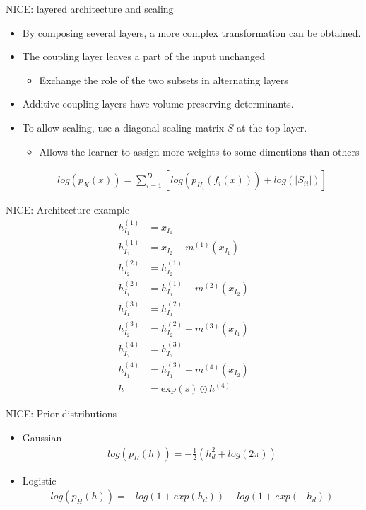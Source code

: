 \begin{frame}{NICE: layered architecture and scaling}
    \begin{itemize}
        \item By composing several layers, a more complex transformation can be obtained.
        \item The coupling layer leaves a part of the input unchanged
        \begin{itemize}
            \item Exchange the role of the two subsets in alternating layers
        \end{itemize}
        \item Additive coupling layers have volume preserving determinants.
        \item To allow scaling, use a diagonal scaling matrix $S$ at the top layer.
        \begin{itemize}
            \item Allows the learner to assign more weights to some dimentions than others
        \end{itemize}
        \begin{align*}
            log(p_X(x)) = \sum_{i=1}^D[log(p_{H_i}(f_i(x)))+log(|S_{ii}|)]
        \end{align*}
    \end{itemize}
\end{frame}
\begin{frame}{NICE: Architecture example}
\begin{align*}
    h_{I_1}^{(1)} &= x_{I_1}\\
    h_{I_2}^{(1)} &= x_{I_2} + m^{(1)}(x_{I_1})\\ 
    h_{I_2}^{(2)} &= h_{I_2}^{(1)}\\
    h_{I_1}^{(2)} &= h_{I_1}^{(1)} + m^{(2)}(x_{I_2})\\ 
    h_{I_1}^{(3)} &= h_{I_1}^{(2)}\\
    h_{I_2}^{(3)} &= h_{I_2}^{(2)} + m^{(3)}(x_{I_1})\\ 
    h_{I_2}^{(4)} &= h_{I_2}^{(3)}\\
    h_{I_1}^{(4)} &= h_{I_1}^{(3)} + m^{(4)}(x_{I_2})\\ 
    h &= \text{exp}(s) \odot h^{(4)}
\end{align*}
\end{frame}
\begin{frame}{NICE: Prior distributions}
    \begin{itemize}
        \item Gaussian
        \begin{align*}
            log(p_H(h)) = -\frac{1}{2}(h_d^2 + log(2\pi))
        \end{align*}
        \item Logistic
        \begin{align*}
            log(p_H(h)) = - log(1+exp(h_d)) - log(1+exp(-h_d))
        \end{align*}
    \end{itemize}
\end{frame}
